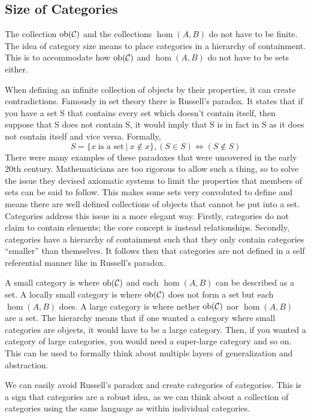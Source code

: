 \documentclass[10pt,a4paper,reqno]{amsart}
\numberwithin{figure}{section}
\begin{document}
\subsection{Size of Categories}
The collection $\operatorname{ob}(\mathcal{C})$ and the collections $\hom(A,B)$ do not have
to be finite. The idea of category size means to place categories in a
hierarchy of containment. This is to accommodate how $\operatorname{ob}(\mathcal{C})$ and
$\hom(A,B)$ do not have to be sets either.

When defining an infinite collection of objects by their properties, it can
create contradictions. Famously in set theory there is Russell's paradox\autocite{Russell:1903}. It
states that if you have a set S that contains every set which doesn't contain
itself, then suppose that S does not contain S, it would imply that S is in fact
in S as it does not contain itself and vice versa. Formally, 
\begin{equation}
S = \{x\;\text{is a set}\:|\:x\notin x\}, (S\in S) \iff (S\notin S)
\end{equation}
There were many examples of these paradoxes that were uncovered in the early
20th century. Mathematicians are too rigorous to allow such a thing, so to solve
the issue they devised axiomatic systems to limit the properties that members of
sets can be said to follow. This makes some sets very convoluted to define and
means there are well defined collections of objects that cannot be put into a
set. Categories address this issue in a more elegant way. Firstly, categories
do not claim to contain elements; the core concept is instead relationships.
Secondly, categories have a hierarchy of containment such that they only contain
categories ``smaller'' than themselves. It follows then that categories are not
defined in a self referential manner like in Russell's paradox.

A small category is where $\operatorname{ob}(\mathcal{C})$ and each $\hom(A,B)$ can be
described as a set. A locally small category is where $\operatorname{ob}(\mathcal{C})$
does not form a set but each $\hom(A,B)$ does. A large category is where nether
$\operatorname{ob}(\mathcal{C})$ nor $\hom(A,B)$ are a set. The hierarchy means that if one
wanted a category where small categories are objects, it would have to be a
large category. Then, if you wanted a category of large categories, you would
need a super-large category and so on. This can be used to formally think about
multiple layers of generalization and abstraction.

We can easily avoid Russell's paradox and create categories of categories. 
This is a sign that categories are a robust idea, as we can think about a collection of 
categories using the same language as within individual categories. 
\end{document}
